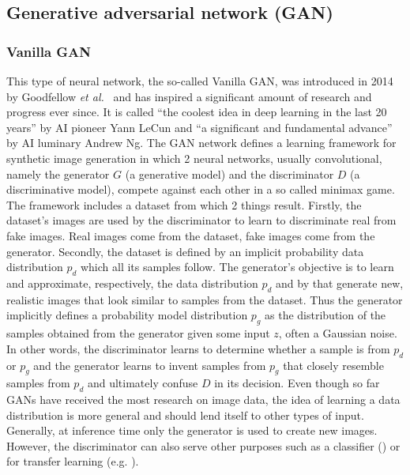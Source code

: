 \documentclass[12pt,a4paper]{article}
\begin{document}
\subsection{Generative adversarial network (GAN)}
\subsubsection{Vanilla GAN}\label{subsec:vanillaGan}
This type of neural network, the so-called Vanilla GAN, was introduced in 2014 by Goodfellow \textit{et al.}~\cite{1406.2661} and has inspired a significant amount of research and progress ever since. It is called ``the coolest idea in deep learning in the last 20 years'' by AI pioneer Yann LeCun and ``a significant and fundamental advance'' by AI luminary Andrew Ng. The GAN network defines a learning framework for synthetic image generation in which 2 neural networks, usually convolutional, namely the generator $G$ (a generative model) and the discriminator $D$ (a discriminative model), compete against each other in a so called minimax game. The framework includes a dataset from which 2 things result. Firstly, the dataset's images are used by the discriminator to learn to discriminate real from fake images. Real images come from the dataset, fake images come from the generator. Secondly, the dataset is defined by an implicit probability data distribution $p_d$ which all its samples follow. The generator's objective is to learn and approximate, respectively, the data distribution $p_d$ and by that generate new, realistic images that look similar to samples from the dataset. Thus the generator implicitly defines a probability model distribution $p_g$ as the distribution of the samples obtained from the generator given some input $z$, often a Gaussian noise. In other words, the discriminator learns to determine whether a sample is from $p_d$ or $p_g$ and the generator learns to invent samples from $p_g$ that closely resemble samples from $p_d$ and ultimately confuse $D$ in its decision. Even though so far GANs have received the most research on image data, the idea of learning a data distribution is more general and should lend itself to other types of input. Generally, at inference time only the generator is used to create new images. However, the discriminator can also serve other purposes such as a classifier (\cite{ImprTechn4TrainGANs}) or for transfer learning (e.g. \cite{SpotArtifacts}).
\end{document}
